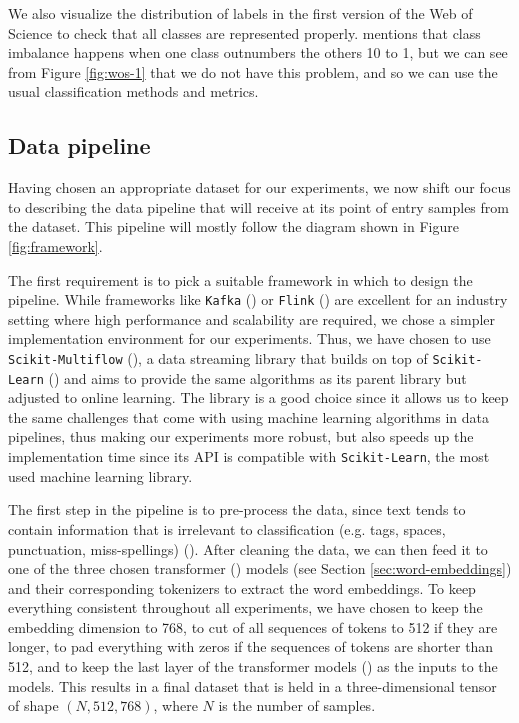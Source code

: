 \documentclass[12pt]{extreport}
\begin{document}
We also visualize the distribution of labels in the first version of the Web of Science to check that all classes are represented properly. \cite{classimbalance} mentions that class imbalance happens when one class outnumbers the others 10 to 1, but we can see from Figure \ref{fig:wos-1} that we do not have this problem, and so we can use the usual classification methods and metrics.

\subsection{Data pipeline}

Having chosen an appropriate dataset for our experiments, we now shift our focus to describing the data pipeline that will receive at its point of entry samples from the dataset. This pipeline will mostly follow the diagram shown in Figure \ref{fig:framework}.

The first requirement is to pick a suitable framework in which to design the pipeline. While frameworks like \texttt{Kafka} (\cite{kafka}) or \texttt{Flink} (\cite{flink}) are excellent for an industry setting where high performance and scalability are required, we chose a simpler implementation environment for our experiments. Thus, we have chosen to use \texttt{Scikit-Multiflow} (\cite{skmultiflow}), a data streaming library that builds on top of \texttt{Scikit-Learn} (\cite{sklearn}) and aims to provide the same algorithms as its parent library but adjusted to online learning. The library is a good choice since it allows us to keep the same challenges that come with using machine learning algorithms in data pipelines, thus making our experiments more robust, but also speeds up the implementation time since its API is compatible with \texttt{Scikit-Learn}, the most used machine learning library.

The first step in the pipeline is to pre-process the data, since text tends to contain information that is irrelevant to classification (e.g. tags, spaces, punctuation, miss-spellings) (\cite{textclassification}). After cleaning the data, we can then feed it to one of the three chosen transformer (\cite{huggingface}) models (see Section \ref{sec:word-embeddings}) and their corresponding tokenizers to extract the word embeddings. To keep everything consistent throughout all experiments, we have chosen to keep the embedding dimension to 768, to cut of all sequences of tokens to 512 if they are longer, to pad everything with zeros if the sequences of tokens are shorter than 512, and to keep the last layer of the transformer models (\cite{attention}) as the inputs to the models. This results in a final dataset that is held in a three-dimensional tensor of shape $(N, 512, 768)$, where $N$ is the number of samples.
\end{document}
